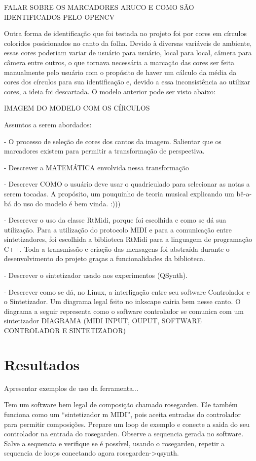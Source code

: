 \documentclass[12pt]{report}
\begin{document}
FALAR SOBRE OS MARCADORES ARUCO E COMO SÃO IDENTIFICADOS PELO OPENCV

Outra forma de identificação que foi testada no projeto foi por cores em círculos coloridos posicionados no canto da folha. Devido à diversas variáveis de ambiente, essas cores poderiam variar de usuário para usuário, local para local, câmera para câmera entre outros, o que tornava necessária a marcação das cores ser feita manualmente pelo usuário com o propósito de haver um cálculo da média da cores dos círculos para sua identificação e, devido a essa inconsistência ao utilizar cores, a ideia foi descartada. O modelo anterior pode ser visto abaixo:

IMAGEM DO MODELO COM OS CÍRCULOS

Assuntos a serem abordados:

- O processo de seleção de cores dos cantos da imagem. Salientar que
os marcadores existem para permitir a transformação de perspectiva.

- Descrever a MATEMÁTICA envolvida nessa transformação 

- Descrever COMO o usuário deve usar o quadriculado para selecionar as
notas a serem tocadas. A propósito, um pouquinho de teoria musical
explicando um bê-a-bá do uso do modelo é bem vinda. :)))

- Descrever o uso da classe RtMidi, porque foi escolhida e como se dá
sua utilização.
Para a utilização do protocolo MIDI e para a comunicação entre sintetizadores, foi escolhida a biblioteca RtMidi para a linguagem de programação C++. Toda a transmissão e criação das mensagens foi abstraída durante o desenvolvimento do projeto graças a funcionalidades da biblioteca.

- Descrever o sintetizador usado nos experimentos (QSynth).

- Descrever como se dá, no Linux, a interligação entre seu software
Controlador e o Sintetizador. Um diagrama legal feito no inkscape
cairia bem nesse canto.
O diagrama a seguir representa como o software controlador se comunica com um sintetizador
DIAGRAMA (MIDI INPUT, OUPUT, SOFTWARE CONTROLADOR E SINTETIZADOR)

\chapter{Resultados}
\label{cha:resultados}

Apresentar exemplos de uso da ferramenta...

Tem um software bem legal de composição chamado rosegarden. Ele também
funciona como um ``sintetizador m MIDI'', pois aceita entradas do
controlador para permitir composições. Prepare um loop de exemplo e
conecte a saida do seu controlador na entrada do rosegarden. Observe a
sequencia gerada no software. Salve a sequencia e verifique se é
possível, usando o rosegarden, repetir a sequencia de loops conectando
agora rosegarden->qsynth.
\end{document}
